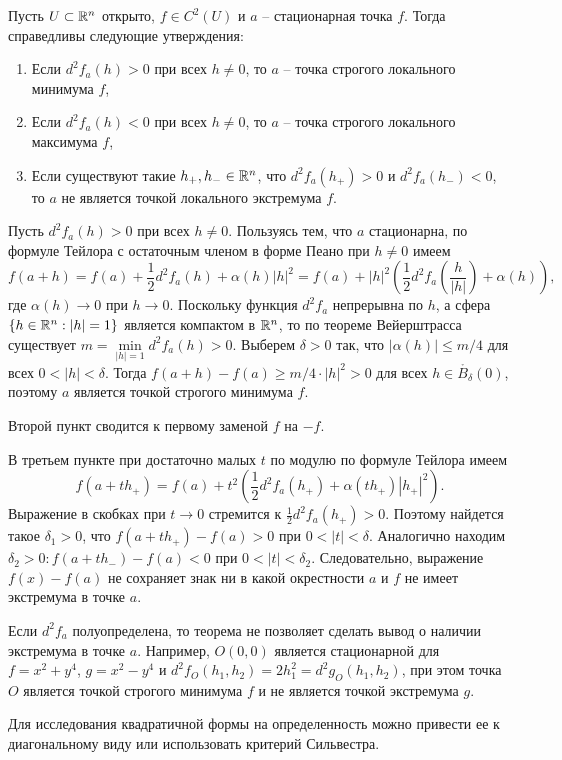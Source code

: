 \begin{theorem}
	Пусть $U \subset \mathbb{R}^n$ открыто, $f \in C^2(U)$ и $a$ -- стационарная точка $f$. Тогда справедливы следующие утверждения:
	\begin{enumerate}[itemsep = 0pt, topsep = 5pt]
		\item Если $d^2 f_a(h) > 0$ при всех $h \neq 0$, то $a$ -- точка строгого локального минимума $f$,
		\item Если $d^2 f_a(h) < 0$ при всех $h \neq 0$, то $a$ -- точка строгого локального максимума $f$,
		\item Если существуют такие $h_+, h_- \in \mathbb{R}^n$, что $d^2 f_a(h_+) > 0$ и $d^2 f_a(h_-) < 0$, то $a$ не является точкой локального экстремума $f$.
	\end{enumerate}
\end{theorem}

\begin{myproof}
	Пусть $d^2 f_a (h) > 0$ при всех $h \neq 0$. Пользуясь тем, что $a$ стационарна, по формуле Тейлора с остаточным членом в форме Пеано при $h \neq 0$ имеем 
	\[ f(a+h) = f(a) + \frac12 d^2 f_a(h) + \alpha(h) |h|^2 = f(a) + |h|^2 \left( \frac12 d^2 f_a \left(\frac{h}{|h|}\right) + \alpha(h) \right), \]
	где $\alpha(h) \to 0$ при $h \to 0$. Поскольку функция $d^2 f_a$ непрерывна по $h$, а сфера $\{h \in \mathbb{R}^n : |h| = 1\}$ является компактом в $\mathbb{R}^n$, то по теореме 
	Вейерштрасса существует $m = \min \limits_{|h| = 1} d^2 f_a(h) > 0$. Выберем $\delta > 0$ так, что $|\alpha(h)| \leq m/4$ для всех $0 < |h| < \delta$. 
	Тогда $f(a+h) - f(a) \geq m/4 \cdot |h|^2 > 0$ для всех $h \in \mathring{B_{\delta}}(0)$, поэтому $a$ является точкой строгого минимума $f$.

	\vspace{5pt}
	Второй пункт сводится к первому заменой $f$ на $-f$.

	\vspace{5pt}
	В третьем пункте при достаточно малых $t$ по модулю по формуле Тейлора имеем
	\[ f(a+th_+) = f(a) + t^2 \left( \frac12 d^2 f_a(h_+) + \alpha(th_+) |h_+|^2 \right). \]
	Выражение в скобках при $t \to 0$ стремится к $\frac12 d^2 f_a (h_+) > 0$. Поэтому найдется такое $\delta_1 > 0$, что $f(a + th_+) - f(a) > 0$ при $0 < |t| < \delta$. 
	Аналогично находим $\delta_2 > 0 : f(a+th_-) - f(a) < 0$ при $0 < |t| < \delta_2$. Следовательно, выражение $f(x) - f(a)$ не сохраняет знак ни в какой окрестности $a$ и $f$ не имеет экстремума в точке $a$.
\end{myproof}

\begin{note}
	Если $d^2 f_a$ полуопределена, то теорема не позволяет сделать вывод о наличии экстремума в точке $a$. 
	Например, $O(0,0)$ является стационарной для $f = x^2 + y^4$, $g = x^2 - y^4$ и $d^2 f_O (h_1, h_2) = 2h_1^2 = d^2 g_O (h_1, h_2)$, при этом точка $O$ является точкой строгого минимума $f$ и не является точкой экстремума $g$.
\end{note}

\begin{note}
	Для исследования квадратичной формы на определенность можно привести ее к диагональному виду или использовать критерий Сильвестра.
\end{note}